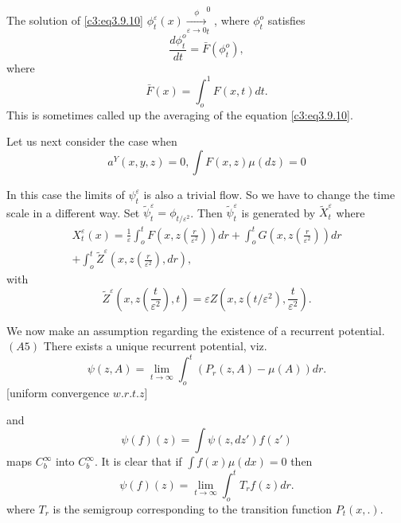 The solution of \eqref{c3:eq3.9.10} $\phi^\varepsilon_t(x)
\xrightarrow[\varepsilon \to 0] \phi^0_t$, where $\phi^o_t$ satisfies 
\begin{equation*}
  \frac{d \phi^o_t}{dt}= \bar{F}
(\phi ^o_t), \tag{3.9.11}\label{c3:eq3.9.11}
\end{equation*}
where
\begin{equation*}
  \bar{F}(x)= \int ^1_o F(x,t)dt. \tag{3.9.12}\label{c3:eq3.9.12}
\end{equation*}
This is sometimes called up the averaging of the equation 
\eqref{c3:eq3.9.10}.

Let us next consider the case when
\begin{equation*}
  a^Y(x,y,z)=0, \int F(x,z)\mu (dz)=0 \tag{3.9.13}\label{c3:eq3.9.13}
\end{equation*}


In this case the limits of $\psi^\varepsilon_t$ is also a trivial flow. So we
have to change the time scale in a different way. Set
$\tilde{\psi}^\varepsilon_t = \phi_{t/ \varepsilon^2}$. Then
$\tilde{\psi}^\varepsilon_t$ is 
generated by $\tilde{X}^\varepsilon_t$ where 
\begin{multline*}
  X^\varepsilon_t (x) = \frac{1}{\varepsilon} \int^t_o F\left(x,z
  \left(\frac{r}{\varepsilon^2} \right) \right) dr +
  \int^t_o G\left(x,z \left(\frac{r}{\varepsilon^2}\right)\right)dr\\ 
  + \int^t_o \tilde{Z}^\varepsilon  \left(x,z \left(\frac{r}{\varepsilon^2}\right),
  dr\right),\qquad  \tag{3.9.14}\label{c3:eq3.9.14}    
\end{multline*}
with
\begin{equation*}
  \tilde{Z}^ \varepsilon \left(x,z
  \left(\frac{t}{\varepsilon^2}\right), t\right) = 
  \varepsilon Z \left(x, z\left(t/
  \varepsilon^2\right),\frac{t}{\varepsilon^2}\right). 
\tag{3.9.15}\label{c3:eq3.9.15}  
\end{equation*}

We now make an assumption regarding the existence of a recurrent
potential. $(A5)$ There exists a unique recurrent potential, viz. 
\begin{equation*}
  \psi (z,A)= \lim_{t \to \infty} \int^t_o (P_r(z,A)- 
\mu (A))dr. \tag{3.9.16}\label{c3:eq3.9.16}
\end{equation*}
\hfill {[uniform convergence $w.r.t.z$]}

\noindent
and 
$$
\psi (f)(z)=\int \psi (z,dz')f(z')
$$
maps $C^\infty_b$ into $C^\infty_b$. It is clear that if $\int
f(x) \mu (dx)=0$ then 
\begin{equation*}
  \psi (f)(z)= \lim_{t \to \infty} \int^t_o 
T_r f(z)dr. \tag{3.9.17}\label{c3:eq3.9.17}
\end{equation*}\pageoriginale
where $T_r$ is the semigroup corresponding to the transition function\break
$P_t(x,.)$. 


